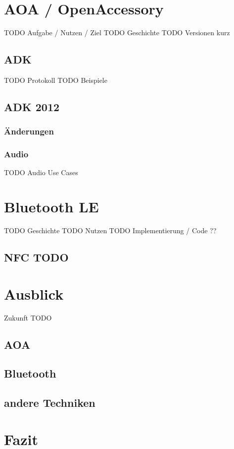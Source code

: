 \documentclass[12pt,journal,compsoc]{IEEEtran}
\begin{document}
\section{AOA / OpenAccessory}

\cite{developaoa}

TODO Aufgabe / Nutzen / Ziel
TODO Geschichte
TODO Versionen kurz

\subsection{ADK}

TODO Protokoll
TODO Beispiele
\subsection{ADK 2012}
\subsubsection{Änderungen}

\subsubsection{Audio}
TODO Audio Use Cases

\section{Bluetooth LE}
TODO Geschichte
TODO Nutzen
TODO Implementierung / Code ??


\subsection{NFC TODO}



\section{Ausblick}
Zukunft TODO
\subsection{AOA}

\subsection{Bluetooth}
\subsection{andere Techniken}

\section{Fazit}








\end{document}
